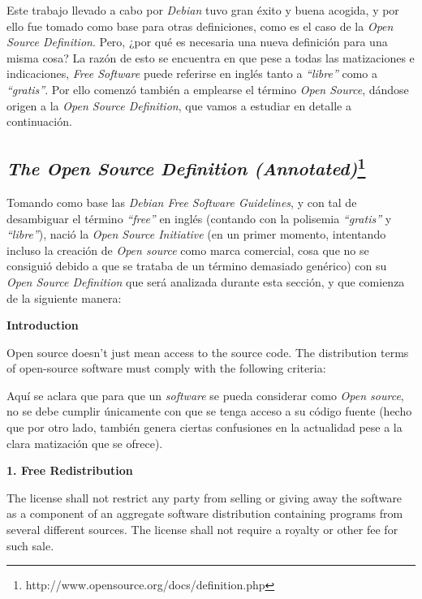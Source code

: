 Este trabajo llevado a cabo por \textit{Debian} tuvo gran éxito y buena acogida,
y por ello fue tomado como base para otras definiciones, como es el caso de
la \textit{Open Source Definition}. Pero, ¿por qué es necesaria una nueva
definición para una misma cosa? La razón de esto se encuentra en que pese a
todas las matizaciones e indicaciones, \textit{Free Software} puede referirse en
inglés tanto a \textit{``libre''} como a \textit{``gratis''}. Por ello comenzó
también a emplearse el término \textit{Open Source}, dándose origen a la
\textit{Open Source Definition}, que vamos a estudiar en detalle a continuación.

\subsection{\textit{The Open Source Definition
(Annotated)}\footnote{http://www.opensource.org/docs/definition.php}}

Tomando como base las \textit{Debian Free Software Guidelines}, y con tal de
desambiguar el término \textit{``free''} en inglés (contando con la polisemia
\textit{``gratis''} y \textit{``libre''}), nació la \textit{Open Source
Initiative} (en un primer momento, intentando incluso la creación de
\textit{Open source} como marca comercial, cosa que no se consiguió debido a que
se trataba de un término demasiado genérico) con su \textit{Open Source
Definition} que será analizada durante esta sección, y que comienza de la
siguiente manera:\newline

{\bf Introduction

Open source doesn't just mean access to the source code. The distribution terms
of open-source software must comply with the following criteria:}\newline

Aquí se aclara que para que un \textit{software} se pueda considerar como
\textit{Open source}, no se debe cumplir únicamente con que se tenga acceso a su
código fuente (hecho que por otro lado, también genera ciertas confusiones en la
actualidad pese a la clara matización que se ofrece).\newline

{\bf 1. Free Redistribution

The license shall not restrict any party from selling or giving away the
software as a component of an aggregate software distribution containing
programs from several different sources. The license shall not require a royalty
or other fee for such sale.}

